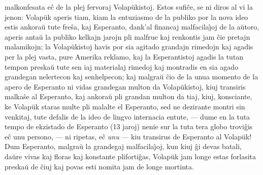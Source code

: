 malkonfesata e\^c de la plej fervoraj Volap\"ukistoj. Estos
sufi\^ce, se ni diros al vi la jenon: Volap\"uk aperis tiam, kiam la
entuziasmo de la publiko por la nova ideo estis ankora\u u tute
fre\^sa, kaj Esperanto, dank'al financaj malfacila\^{\j}oj de la a\u
utoro, aperis anta\u u la publiko kelkajn jarojn pli malfrue kaj
renkontis jam \^cie pretajn malamikojn; la Volap\"ukistoj havis por
sia agitado grandajn rimedojn kaj agadis per la plej vasta, pure
Amerika reklamo, kaj la Esperantistoj agadis la tutan tempon
preska\u u tute sen iaj materialaj rimedoj kaj montradis en sia
agado grandegan nelertecon kaj senhelpecon; kaj malgra\u u \^cio de
la unua momento de la apero de Esperanto ni vidas grandegan multon
da Volap\"ukistoj, kiuj transiris malka\^se al Esperanto, kaj
ankora\u u pli grandan multon da tiaj, kiuj, konsciante, ke
Volap\"uk staras multe pli malalte el Esperanto, sed ne dezirante
montri sin venkitaj, tute defalis de la ideo de lingvo internacia
entute,\enlargethispage{-2\baselineskip}
--- dume en la tuta tempo de ekzistado de Esperanto (13 jaroj) nenie
sur la tuta tera globo trovi\^gis e\^c unu persono, --- ni ripetas,
e\^c {\sl unu} --- kiu transirus de Esperanto al Volap\"uk! Dum
Esperanto, malgra\u u la grandegaj malfacila\^{\j}oj, kun kiuj \^gi
devas batali, da\u ure vivas kaj floras kaj konstante pliforti\^gas,
Volap\"uk jam longe estas forlasita preska\u u de \^ciuj kaj povas
esti nomita jam de longe mortinta.

